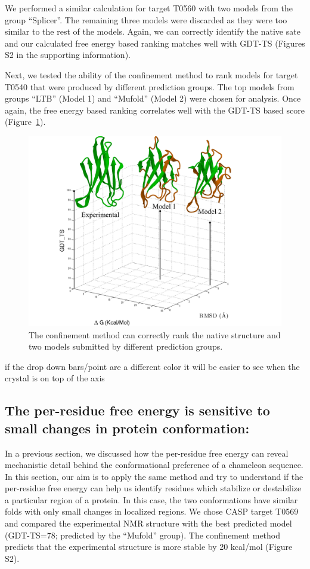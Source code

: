 \documentclass[12pt]{article}
\newcommand{\Alberto}[1]{\color{ForestGreen}#1\normalcolor }
\begin{document}
We performed a similar calculation for target T0560 with two models from the group ``Splicer''. The remaining three
models were discarded as they were too similar to the rest of the models. Again, we can correctly identify the native
sate and our calculated free energy based ranking matches well with GDT-TS (Figures S2 in the supporting information).



Next, we tested the ability of the confinement method to rank models for target T0540 that were produced by different
prediction groups. The top models from groups ``LTB'' (Model 1) and ``Mufold'' (Model 2) were chosen for analysis. Once
again, the free energy based ranking correlates well with the GDT-TS based score (Figure~\ref{fig:T0540}).

\begin{figure}
    \begin{center}
        \includegraphics[width=3.5 in]{T0540.pdf}
    \end{center}
    \caption{The confinement method can correctly rank the native structure and two models submitted by different
        prediction groups.}
\label{fig:T0540}
\end{figure}
\Alberto{if the drop down bars/point are a different color it will be easier to see when the crystal
is on top of the axis}
\subsection*{The per-residue free energy is sensitive to small changes in protein conformation:}

In a previous section, we discussed how the per-residue free energy can reveal mechanistic
detail behind the conformational preference of a chameleon sequence. In this section, our aim is to apply the same
method and try to understand if the per-residue free energy can help us identify residues which stabilize or destabilize
a particular region of a protein. In this case, the two conformations have similar folds with only small changes in
localized regions. We chose CASP target T0569 and compared the experimental NMR structure with the best predicted model
(GDT-TS=78; predicted by the ``Mufold'' group). The confinement method predicts that the experimental structure is more stable
by 20 kcal/mol (Figure S2).
\end{document}

